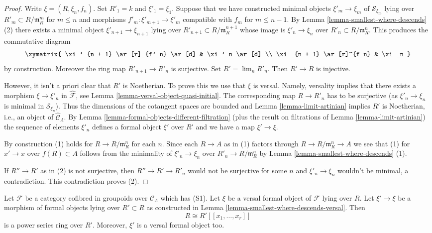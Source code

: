 \begin{proof}
Write $\xi = (R, \xi_n, f_n)$. Set $R'_1 = k$ and
$\xi'_1 = \xi_1$. Suppose that we have constructed
minimal objects $\xi'_m \to \xi_m$ of $\mathcal{S}_{\xi_m}$
lying over $R'_m \subset R/\mathfrak m_R^m$ for $m \leq n$
and morphisms $f'_m : \xi'_{m + 1} \to \xi'_m$ compatible with $f_m$
for $m \leq n - 1$. By
Lemma \ref{lemma-smallest-where-descends} (2)
there exists a minimal object $\xi'_{n + 1} \to \xi_{n + 1}$ lying over
$R'_{n + 1} \subset R/\mathfrak m_R^{n + 1}$ whose image
is $\xi'_n \to \xi_n$ over $R'_n \subset R/\mathfrak m_R^n$.
This produces the commutative diagram
$$
\xymatrix{
\xi'_{n + 1} \ar[r]_{f'_n} \ar[d] & \xi'_n \ar[d] \\
\xi_{n + 1} \ar[r]^{f_n} & \xi_n
}
$$
by construction. Moreover the ring map $R'_{n + 1} \to R'_n$
is surjective. Set $R' = \lim_n R'_n$. Then $R' \to R$ is injective.

\medskip\noindent
However, it isn't a priori clear that $R'$ is Noetherian. To prove this
we use that $\xi$ is versal. Namely, versality implies that there exists
a morphism $\xi \to \xi'_n$ in $\widehat{\mathcal{F}}$, see
Lemma \ref{lemma-versal-object-quasi-initial}.
The corresponding map $R \to R'_n$ has to be surjective (as
$\xi'_n \to \xi_n$ is minimal in $\mathcal{S}_{\xi_n}$).
Thus the dimensions of the cotangent spaces are bounded and
Lemma \ref{lemma-limit-artinian}
implies $R'$ is Noetherian, i.e., an object of $\widehat{\mathcal{C}}_\Lambda$.
By
Lemma \ref{lemma-formal-objects-different-filtration}
(plus the result on filtrations of
Lemma \ref{lemma-limit-artinian})
the sequence of elements $\xi'_n$ defines a formal object $\xi'$ over $R'$
and we have a map $\xi' \to \xi$.

\medskip\noindent
By construction (1) holds for $R \to R/\mathfrak m_R^n$ for each $n$.
Since each $R \to A$ as in (1) factors through $R \to R/\mathfrak m_R^n \to A$
we see that (1) for $x' \to x$ over $f(R) \subset A$ follows from the
minimality of $\xi'_n \to \xi_n$ over $R'_n \to R/\mathfrak m_R^n$ by
Lemma \ref{lemma-smallest-where-descends} (1).

\medskip\noindent
If $R'' \to R'$ as in (2) is not surjective, then $R'' \to R' \to R'_n$
would not be surjective for some $n$ and $\xi'_n \to \xi_n$ wouldn't
be minimal, a contradiction. This contradiction proves (2).
\end{proof}

\begin{lemma}
\label{lemma-descends-versal}
Let $\mathcal{F}$ be a category cofibred in groupoids over
$\mathcal{C}_\Lambda$ which has (S1). Let $\xi$ be a versal formal object
of $\mathcal{F}$ lying over $R$. Let $\xi' \to \xi$ be a morphism
of formal objects lying over $R' \subset R$ as constructed in
Lemma \ref{lemma-smallest-where-descends-versal}.
Then
$$
R \cong R'[[x_1, \ldots, x_r]]
$$
is a power series ring over $R'$.
Moreover, $\xi'$ is a versal formal object too.
\end{lemma}

